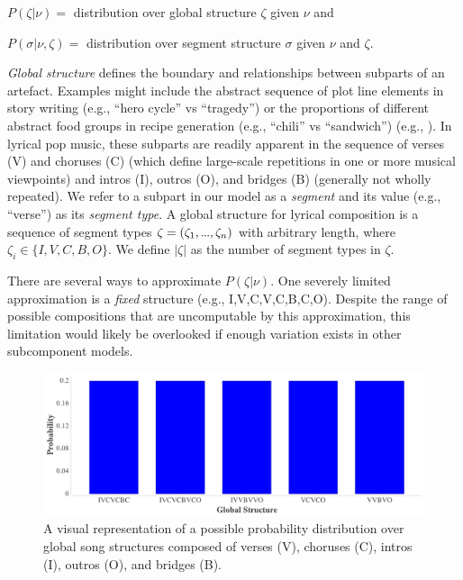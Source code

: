 \documentclass[phd,electronic,oneside,twosidetoc,letterpaper,chaptercenter,parttop,lof,lot]{byumsphd}
\newcommand\mydots{\hbox to .75em{.\hss.\hss.}}
\begin{document}
\(P(\zeta|\nu)=\) distribution over global structure $\zeta$ given $\nu$ and

\(P(\sigma|\nu,\zeta)=\) distribution over segment structure $\sigma$ given $\nu$ and $\zeta$.

\emph{Global structure} defines the boundary and relationships between subparts of an artefact. Examples might include the abstract sequence of plot line elements in story writing (e.g., ``hero cycle'' vs ``tragedy'') or the proportions of different abstract food groups in recipe generation (e.g., ``chili'' vs ``sandwich'') (e.g., \cite{morris2012soup}). In lyrical pop music, these subparts are readily apparent in the sequence of verses (V) and choruses (C) (which define large-scale repetitions in one or more musical viewpoints) and intros (I), outros (O), and bridges (B) (generally not wholly repeated). We refer to a subpart in our model as a \textit{segment} and its value (e.g., ``verse'') as its \textit{segment type}. A global structure for lyrical composition is a sequence of segment types $\zeta = (\zeta_1,\mydots,\zeta_n)$ with arbitrary length, where $\zeta_i\in\{I,V,C,B,O\}$. We define $|\zeta|$ as the number of segment types in $\zeta$.

There are several ways to approximate $P(\zeta|\nu)$. One severely limited approximation is a \textit{fixed} structure (e.g., I,V,C,V,C,B,C,O). Despite the range of possible compositions that are uncomputable by this approximation, this limitation would likely be overlooked if enough variation exists in other subcomponent models.

\begin{figure}
	\centering
	\includegraphics[width=\linewidth]{global_structure}
	\caption{\label{fig:global_structure} A visual representation of a possible probability distribution over global song structures composed of verses (V), choruses (C), intros (I), outros (O), and bridges (B).}
\end{figure}
\end{document}
